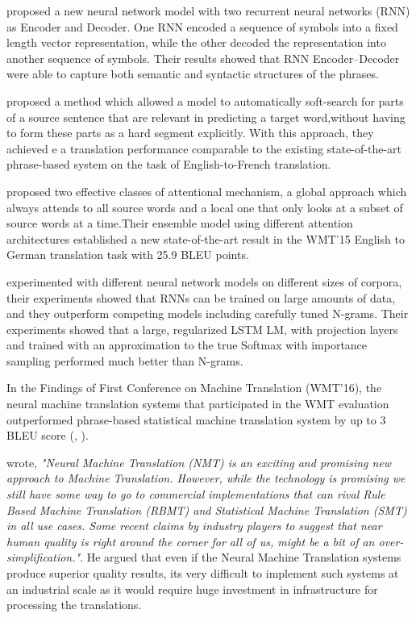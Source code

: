 \cite{DBLP:journals/corr/ChoMGBSB14} proposed a new neural network model with two recurrent neural networks (RNN) as Encoder and Decoder. One RNN encoded a sequence of symbols into a fixed length vector representation, while the other decoded the representation into another sequence of symbols. Their results showed that RNN Encoder–Decoder were able to capture both semantic and syntactic structures of the phrases.

\cite{DBLP:journals/corr/BahdanauCB14} proposed a method which allowed a model to automatically soft-search for parts of a source sentence that are relevant in predicting a target word,without having to form these parts as a hard segment explicitly. With this approach, they achieved e a translation performance comparable to the existing state-of-the-art
phrase-based system on the task of English-to-French translation.

\cite{DBLP:journals/corr/LuongPM15} proposed two effective classes of attentional mechanism, a global approach which always attends to all source words and a local one that only looks at a subset of source words at a time.Their ensemble model using different attention architectures established a new state-of-the-art result in the WMT'15 English to German translation task with 25.9 BLEU points.

\cite{DBLP:journals/corr/JozefowiczVSSW16} experimented with different neural network models on different sizes of corpora, their experiments showed that RNNs can be trained
on large amounts of data, and they outperform competing models
including carefully tuned N-grams. Their experiments showed that a large, regularized LSTM LM, with projection layers and trained with an approximation to the true Softmax with importance sampling performed much better than N-grams.


In the Findings of First Conference on Machine Translation (WMT'16), the neural machine translation systems that participated in the WMT evaluation outperformed phrase-based statistical machine translation system by up to 3 BLEU score (\citeauthor{WMT:2016}, \citeyear{WMT:2016}).

\cite{koehnblog} wrote, \textit{"Neural Machine Translation (NMT) is an exciting and promising new approach to Machine Translation. However, while the technology is promising we still have some way to go to commercial implementations that can rival Rule Based Machine Translation (RBMT) and Statistical Machine Translation (SMT) in all use cases. Some recent claims by industry players to suggest that near human quality is right around the corner for all of us, might be a bit of an over-simplification."}. He argued that even if the Neural Machine Translation systems produce superior quality results, its very difficult to implement such systems at an industrial scale as it would require huge investment in infrastructure for processing the translations.

